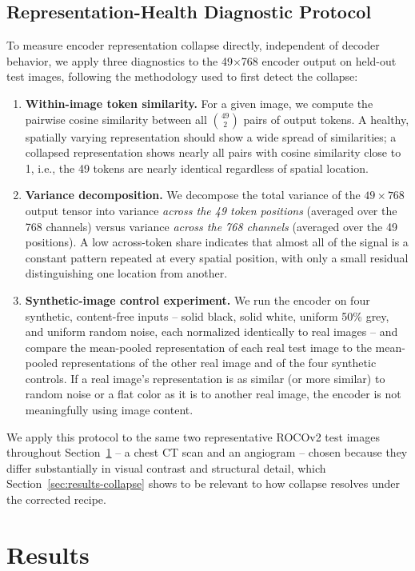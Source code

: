 \documentclass[conference]{IEEEtran}
\begin{document}
\subsection{Representation-Health Diagnostic Protocol}
\label{sec:experiments-collapse}
To measure encoder representation collapse directly, independent of decoder behavior, we apply three diagnostics to the 49$\times$768 encoder output on held-out test images, following the methodology used to first detect the collapse:
\begin{enumerate}
    \item \textbf{Within-image token similarity.} For a given image, we compute the pairwise cosine similarity between all $\binom{49}{2}$ pairs of output tokens. A healthy, spatially varying representation should show a wide spread of similarities; a collapsed representation shows nearly all pairs with cosine similarity close to 1, i.e., the 49 tokens are nearly identical regardless of spatial location.
    \item \textbf{Variance decomposition.} We decompose the total variance of the $49\times768$ output tensor into variance \emph{across the 49 token positions} (averaged over the 768 channels) versus variance \emph{across the 768 channels} (averaged over the 49 positions). A low across-token share indicates that almost all of the signal is a constant pattern repeated at every spatial position, with only a small residual distinguishing one location from another.
    \item \textbf{Synthetic-image control experiment.} We run the encoder on four synthetic, content-free inputs -- solid black, solid white, uniform 50\% grey, and uniform random noise, each normalized identically to real images -- and compare the mean-pooled representation of each real test image to the mean-pooled representations of the other real image and of the four synthetic controls. If a real image's representation is as similar (or more similar) to random noise or a flat color as it is to another real image, the encoder is not meaningfully using image content.
\end{enumerate}
We apply this protocol to the same two representative ROCOv2 test images throughout Section~\ref{sec:results} -- a chest CT scan and an angiogram -- chosen because they differ substantially in visual contrast and structural detail, which Section~\ref{sec:results-collapse} shows to be relevant to how collapse resolves under the corrected recipe.

\section{Results}
\label{sec:results}
\end{document}

